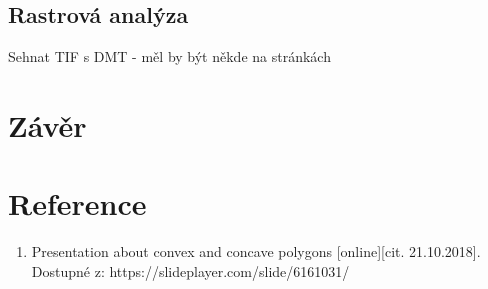 \documentclass[a4paper, 12pt]{article}
\begin{document}
\subsection{Rastrová analýza}
Sehnat TIF s DMT - měl by být někde na stránkách



\section{Závěr}

\clearpage
\section{Reference}

\begin{enumerate}
\item  Presentation about convex and concave polygons [online][cit. 21.10.2018]. \\
Dostupné z: https://slideplayer.com/slide/6161031/  \\


\end{enumerate}
\end{document}
